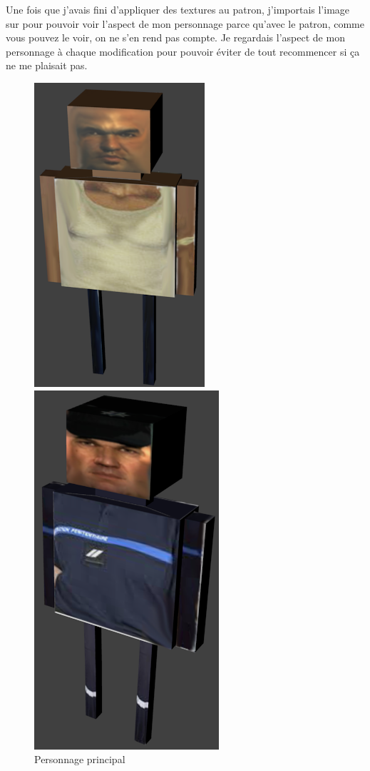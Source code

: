 \documentclass{article}
\begin{document}
\par
Une fois que j’avais fini d’appliquer des textures au patron, j’importais l’image sur  pour pouvoir voir l’aspect de mon personnage parce qu’avec le patron, comme vous pouvez le voir, on ne s’en rend pas compte. Je regardais l’aspect de mon personnage à chaque modification pour pouvoir éviter de tout recommencer si ça ne me plaisait pas.
\newline

\newpage
\begin{figure}[htbp]
\begin{minipage}[c]{.45\linewidth}
\begin{center}
\includegraphics[scale=0.6]{michael.png}
\caption{Personnage principal}
\label{fig:michael}
\end{center}
\end{minipage}
\hfill
\begin{minipage}[c]{.45\linewidth}
\begin{center}
\includegraphics[scale=0.5]{bellik.png}

\end{center}
\end{minipage}
\end{figure}
\end{document}
